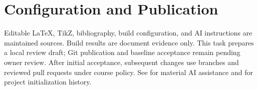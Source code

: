 \section{Configuration and Publication}
Editable LaTeX, TikZ, bibliography, build configuration, and AI instructions
are maintained sources. Build results are document evidence only.
This task prepares a local review draft; Git publication and baseline acceptance
remain pending owner review. After initial acceptance, subsequent changes use
branches and reviewed pull requests under course policy.
See  for material AI assistance and
 for project initialization history.
